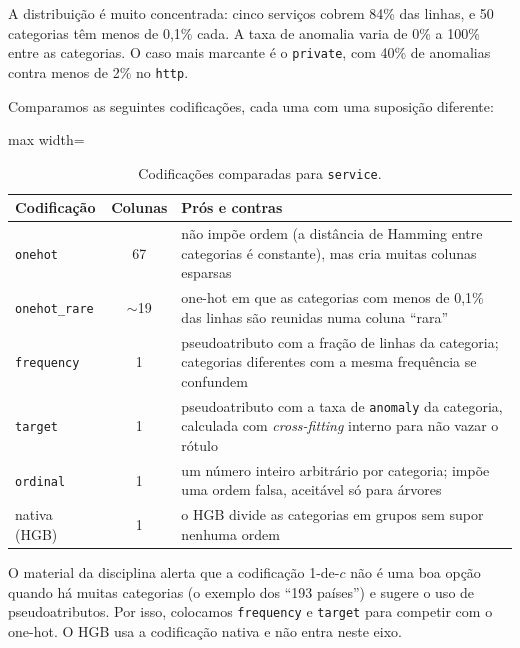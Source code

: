 \documentclass[11pt,a4paper]{article}
\begin{document}
A distribuição é muito concentrada: cinco serviços cobrem 84\% das linhas, e 50 categorias têm menos de 0,1\% cada. A taxa de anomalia varia de 0\% a 100\% entre as categorias. O caso mais marcante é o \texttt{private}, com 40\% de anomalias contra menos de 2\% no \texttt{http}.

Comparamos as seguintes codificações, cada uma com uma suposição diferente:

\begin{table}[H]
\centering
\caption{Codificações comparadas para \texttt{service}.}
\begin{adjustbox}{max width=\linewidth}
\begin{tabular}{lcp{10cm}}
\toprule
Codificação & Colunas & Prós e contras \\
\midrule
\texttt{onehot} & 67 & não impõe ordem (a distância de Hamming entre categorias é constante), mas cria muitas colunas esparsas \\
\texttt{onehot\_rare} & $\sim$19 & one-hot em que as categorias com menos de 0,1\% das linhas são reunidas numa coluna ``rara'' \\
\texttt{frequency} & 1 & pseudoatributo com a fração de linhas da categoria; categorias diferentes com a mesma frequência se confundem \\
\texttt{target} & 1 & pseudoatributo com a taxa de \texttt{anomaly} da categoria, calculada com \emph{cross-fitting} interno para não vazar o rótulo \\
\texttt{ordinal} & 1 & um número inteiro arbitrário por categoria; impõe uma ordem falsa, aceitável só para árvores \\
nativa (HGB) & 1 & o HGB divide as categorias em grupos sem supor nenhuma ordem \\
\bottomrule
\end{tabular}
\end{adjustbox}
\end{table}

O material da disciplina alerta que a codificação 1-de-$c$ não é uma boa opção quando há muitas categorias (o exemplo dos ``193 países'') e sugere o uso de pseudoatributos. Por isso, colocamos \texttt{frequency} e \texttt{target} para competir com o one-hot. O HGB usa a codificação nativa e não entra neste eixo.
\end{document}
